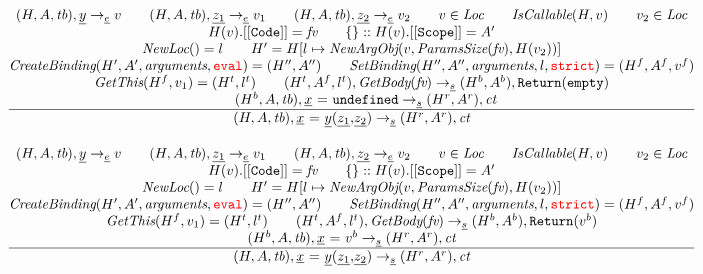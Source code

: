 \documentclass[a4paper, leqno]{amsart}
\newcommand{\rulesep}{\quad\quad}
\newcommand{\stmt}{s}
\newcommand{\expr}{e}
\newcommand{\ir}[1]{\ensuremath{\underline{#1}}}
\newcommand{\irid}{\ir{x}}
\def\inred{\color{red}}
\newcommand{\strict}{{\inred\tt strict}}
\newcommand{\eval}{{\inred\tt eval}}
\newcommand{\undef}{{\tt undefined}}
\newcommand{\tb}{\emph{tb}}
\newcommand{\Loc}{\emph{Loc}}
\newcommand{\ct}{\emph{ct}}
\newcommand{\hf}[1]{\emph{#1}}
\newcommand{\state}{\ensuremath{(H,A,\tb)}}
\newcommand{\respp}{\ensuremath{(H'',A'')}}
\newcommand{\evale}{\ensuremath{(H,A,\tb)}}
\newcommand{\ircall}{\ensuremath{\irid \ {\tt =} \ \ir{y}{\tt(}\ir{z_1}{\tt,}\ir{z_2}{\tt)}}}
\def\inred{\color{red}}
\begin{document}
\[\begin{array}{l@{~~}l@{~~}ll}
\frac{\begin{matrix}
\evale, \ir{y} \rightarrow_{\ir\expr} v
\rulesep
\evale, \ir{z_1} \rightarrow_{\ir\expr} v_1
\rulesep
\evale, \ir{z_2} \rightarrow_{\ir\expr} v_2
\rulesep
v \in \Loc
\rulesep
\hf{IsCallable}(H,v)
\rulesep
v_2 \in \Loc
\\
H(v).{\tt[[Code]]} = \emph{fv}
\rulesep
\{\}::H(v).{\tt[[Scope]]} = A'
\\
\hf{NewLoc}() = l
\rulesep
H' = H[l\mapsto \hf{NewArgObj}(v, \hf{ParamsSize}(\emph{fv}), H(v_2))]
\\
\hf{CreateBinding}(H', A', \hf{arguments}, \eval) = \respp%
\rulesep
\hf{SetBinding}(H'', A'', \hf{arguments}, l, \strict) = (H^f, A^f, v^f)%
\\
\hf{GetThis}(H^f,v_1) = (H^t,l^t)
\rulesep
(H^t, A^f, l^t), \hf{GetBody}(\emph{fv}) \rightarrow_{\ir\stmt} (H^b, A^b), {\tt Return}({\tt empty})
\\
\rulesep
(H^b, A, \tb), \irid\ {\tt =} \ \undef \rightarrow_{\ir\stmt} (H^r,A^r), \ct
\end{matrix}}{\begin{matrix}
\state, \ircall \rightarrow_{\ir\stmt}
(H^r, A^r), \ct
\end{matrix}}
\\[2em]

\frac{\begin{matrix}
\evale, \ir{y} \rightarrow_{\ir\expr} v
\rulesep
\evale, \ir{z_1} \rightarrow_{\ir\expr} v_1
\rulesep
\evale, \ir{z_2} \rightarrow_{\ir\expr} v_2
\rulesep
v \in \Loc
\rulesep
\hf{IsCallable}(H,v)
\rulesep
v_2 \in \Loc
\\
H(v).{\tt[[Code]]} = \emph{fv}
\rulesep
\{\}::H(v).{\tt[[Scope]]} = A'
\\
\hf{NewLoc}() = l
\rulesep
H' = H[l\mapsto \hf{NewArgObj}(v, \hf{ParamsSize}(\emph{fv}), H(v_2))]
\\
\hf{CreateBinding}(H', A', \hf{arguments}, \eval) = \respp%
\rulesep
\hf{SetBinding}(H'', A'', \hf{arguments}, l, \strict) = (H^f, A^f, v^f)%
\\
\hf{GetThis}(H^f,v_1) = (H^t,l^t)
\rulesep
(H^t, A^f, l^t), \hf{GetBody}(\emph{fv}) \rightarrow_{\ir\stmt} (H^b, A^b), {\tt Return}(v^b)
\\
(H^b, A, \tb), \irid\ {\tt =} \ v^b \rightarrow_{\ir\stmt} (H^r,A^r), \ct
\end{matrix}}{\begin{matrix}
\state, \ircall \rightarrow_{\ir\stmt}
(H^r,A^r), \ct
\end{matrix}}
\\[2em]


\end{array}\]
\end{document}
